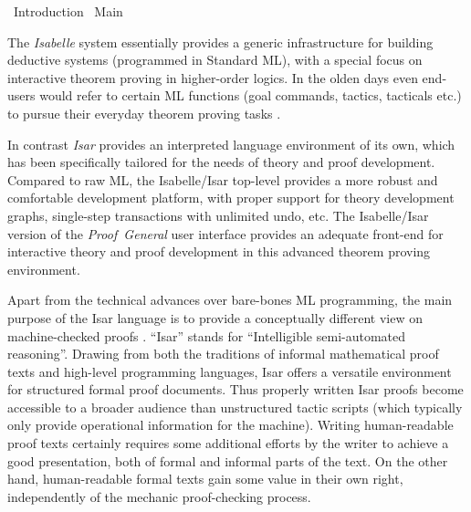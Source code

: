 %
\begin{isabellebody}%
\def\isabellecontext{Introduction}%
%
\isadelimtheory
%
\endisadelimtheory
%
\isatagtheory
{}\isamarkupfalse%
\ Introduction\isanewline
{}\ Main\isanewline
{}%
\endisatagtheory
{\isafoldtheory}%
%
\isadelimtheory
%
\endisadelimtheory
%
\isamarkuptrue%
%
\isamarkuptrue%
%
\begin{isamarkuptext}%
The \emph{Isabelle} system essentially provides a generic
  infrastructure for building deductive systems (programmed in
  Standard ML), with a special focus on interactive theorem proving in
  higher-order logics.  In the olden days even end-users would refer
  to certain ML functions (goal commands, tactics, tacticals etc.) to
  pursue their everyday theorem proving tasks
  \cite{isabelle-intro,isabelle-ref}.
  
  In contrast \emph{Isar} provides an interpreted language environment
  of its own, which has been specifically tailored for the needs of
  theory and proof development.  Compared to raw ML, the Isabelle/Isar
  top-level provides a more robust and comfortable development
  platform, with proper support for theory development graphs,
  single-step transactions with unlimited undo, etc.  The
  Isabelle/Isar version of the \emph{Proof~General} user interface
  \cite{proofgeneral,Aspinall:TACAS:2000} provides an adequate
  front-end for interactive theory and proof development in this
  advanced theorem proving environment.

  \medskip Apart from the technical advances over bare-bones ML
  programming, the main purpose of the Isar language is to provide a
  conceptually different view on machine-checked proofs
  \cite{Wenzel:1999:TPHOL,Wenzel-PhD}.  ``Isar'' stands for
  ``Intelligible semi-automated reasoning''.  Drawing from both the
  traditions of informal mathematical proof texts and high-level
  programming languages, Isar offers a versatile environment for
  structured formal proof documents.  Thus properly written Isar
  proofs become accessible to a broader audience than unstructured
  tactic scripts (which typically only provide operational information
  for the machine).  Writing human-readable proof texts certainly
  requires some additional efforts by the writer to achieve a good
  presentation, both of formal and informal parts of the text.  On the
  other hand, human-readable formal texts gain some value in their own
  right, independently of the mechanic proof-checking process.


\end{isamarkuptext}
\end{isabellebody}
